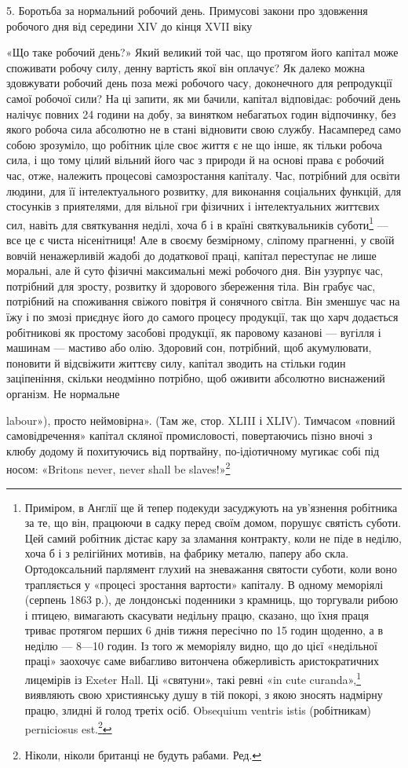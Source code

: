 5. Боротьба за нормальний робочий день. Примусові закони про
здовження робочого дня від середини XIV до кінця XVII віку

«Що таке робочий день?» Який великий той час, що протягом
його капітал може споживати робочу силу, денну вартість якої
він оплачує? Як далеко можна здовжувати робочий день поза
межі робочого часу, доконечного для репродукції самої робочої
сили? На ці запити, як ми бачили, капітал відповідає: робочий
день налічує повних 24 години на добу, за винятком небагатьох
годин відпочинку, без якого робоча сила абсолютно не в стані
відновити свою службу. Насамперед само собою зрозуміло, що
робітник ціле своє життя є не що інше, як тільки робоча сила,
і що тому цілий вільний його час з природи й на основі права є
робочий час, отже, належить процесові самозростання капіталу.
Час, потрібний для освіти людини, для її інтелектуального розвитку,
для виконання соціальних функцій, для стосунків з приятелями,
для вільної гри фізичних і інтелектуальних життєвих
сил, навіть для святкування неділі, хоча б і в країні святкувальників
суботи\footnote{
Приміром, в Англії ще й тепер подекуди засуджують на ув’язнення
робітника за те, що він, працюючи в садку перед своїм домом, порушує
святість суботи. Цей самий робітник дістає кару за зламання контракту,
коли не піде в неділю, хоча б і з релігійних мотивів, на фабрику металю,
паперу або скла. Ортодоксальний парлямент глухий на зневажання святости
суботи, коли воно трапляється у «процесі зростання вартости»
капіталу. В одному меморіялі (серпень 1863 р.), де лондонські поденники
з крамниць, що торгували рибою і птицею, вимагають скасувати недільну
працю, сказано, що їхня праця триває протягом перших 6 днів тижня
пересічно по 15 годин щоденно, а в неділю — 8—10 годин. Із того ж меморіялу
видно, що до цієї «недільної праці» заохочує саме вибагливо
витончена обжерливість аристократичних лицемірів із Exeter Hall.
Ці «святуни», такі ревні «in cute curanda»,\footnote*{
— в піклуванні про себе. Ред.
} виявляють свою християнську
душу в тій покорі, з якою зносять надмірну працю, злидні й голод
третіх осіб. Obsequium ventris istis (робітникам) perniciosus est.\footnote*{
Догоджати череву є для них (робітників) згубна річ. Ред.
}
} — все це є чиста нісенітниця! Але в своєму безмірному,
сліпому прагненні, у своїй вовчій ненажерливій жадобі
до додаткової праці, капітал переступає не лише моральні,
але й суто фізичні максимальні межі робочого дня. Він узурпує
час, потрібний для зросту, розвитку й здорового збереження
тіла. Він грабує час, потрібний на споживання свіжого повітря
й сонячного світла. Він зменшує час на їжу і по змозі приєднує
його до самого процесу продукції, так що харч додається робітникові
як простому засобові продукції, як паровому казанові —
вугілля і машинам — мастиво або олію. Здоровий сон, потрібний,
щоб акумулювати, поновити й відсвіжити життєву силу, капітал
зводить на стільки годин заціпеніння, скільки неодмінно потрібно,
щоб оживити абсолютно виснажений організм. Не нормальне

labour»), просто неймовірна». (Там же, стор. XLIII і XLIV). Тимчасом
«повний самовідречення» капітал скляної промисловості, повертаючись
пізно вночі з клюбу додому й похитуючись від портвайну, по-ідіотичному
мугикає собі під носом: «Britons never, never shall be slaves!»\footnote*{
Ніколи, ніколи британці не будуть рабами. Ред.
}